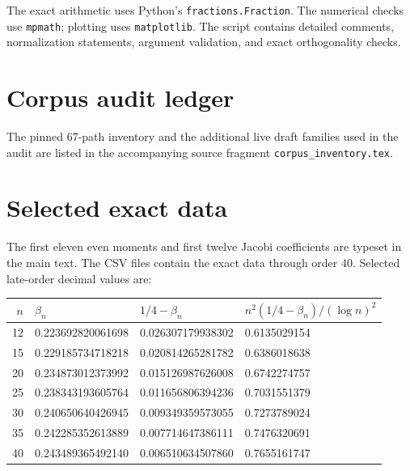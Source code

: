 \documentclass[11pt]{article}
\theoremstyle{definition}
\theoremstyle{remark}
\begin{document}
The exact arithmetic uses Python's \texttt{fractions.Fraction}.  The numerical checks use
\texttt{mpmath}; plotting uses \texttt{matplotlib}.  The script contains detailed comments,
normalization statements, argument validation, and exact orthogonality checks.

\section{Corpus audit ledger}\label{app:corpus}

The pinned 67-path inventory and the additional live draft families used in the audit are
listed in the accompanying source fragment \texttt{corpus\_inventory.tex}.



\section{Selected exact data}\label{app:data}

The first eleven even moments and first twelve Jacobi coefficients are typeset in the main
text.  The CSV files contain the exact data through order 40.  Selected late-order decimal
values are:
\begin{center}
\begin{tabular}{rlll}
\toprule
\(n\) & \(\beta_n\) & \(1/4-\beta_n\) &
\(n^2(1/4-\beta_n)/(\log n)^2\) \\
\midrule
12 & 0.223692820061698 & 0.026307179938302 & 0.6135029154 \\
15 & 0.229185734718218 & 0.020814265281782 & 0.6386018638 \\
20 & 0.234873012373992 & 0.015126987626008 & 0.6742274757 \\
25 & 0.238343193605764 & 0.011656806394236 & 0.7031551379 \\
30 & 0.240650640426945 & 0.009349359573055 & 0.7273789024 \\
35 & 0.242285352613889 & 0.007714647386111 & 0.7476320691 \\
40 & 0.243489365492140 & 0.006510634507860 & 0.7655161747 \\
\bottomrule
\end{tabular}
\end{center}
\end{document}
